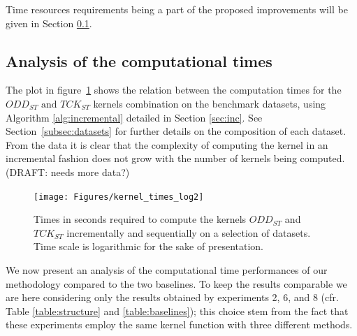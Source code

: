Time resources requirements being a part of the proposed improvements will be given
in Section \ref{subsec:time_results}.

\subsection{Analysis of the computational times}
\label{subsec:time_results}

The plot in figure~\ref{fig:times} shows the relation between the computation times
for the $ODD_{ST}\text{ and }TCK_{ST}$ kernels combination on the benchmark datasets,
using Algorithm \ref{alg:incremental} detailed in Section \ref{sec:inc}.
See Section~\ref{subsec:datasets} for further details on the composition of each dataset.
From the data it is clear that the complexity of computing the kernel in an incremental
fashion does not grow with the number of kernels being computed. (DRAFT: needs more data?)

\begin{figure}[ht]
    \centering
    \texttt{[image: Figures/kernel\_times\_log2]}
    \caption{Times in seconds required to compute the kernels $ODD_{ST}$ and 
    $TCK_{ST}$ incrementally and sequentially on a selection of datasets. Time
    scale is logarithmic for the sake of presentation.}
    \label{fig:times}
\end{figure}

We now present an analysis of the computational time performances of our methodology
compared to the two baselines. To keep the results comparable we are here considering
only the results obtained by experiments 2, 6, and 8 (cfr. Table \ref{table:structure} and \ref{table:baselines});
this choice stem from the fact
that these experiments employ the same kernel function with three different methods.

